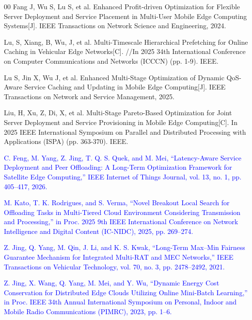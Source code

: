 \documentclass[10pt, conference, letterpaper]{IEEEtran}
\newcommand{\rev}[1]{\textcolor{blue}{#1}}
\newcommand{\rev}[1]{#1}
\begin{document}
\begin{thebibliography}{00}
 Fang J, Wu S, Lu S, et al. Enhanced Profit-driven Optimization for Flexible Server Deployment and Service Placement in Multi-User Mobile Edge Computing Systems[J]. IEEE Transactions on Network Science and Engineering, 2024.

 Lu, S, Xiang, B, Wu, J, et al. Multi-Timescale Hierarchical Prefetching for Online Caching in Vehicular Edge Networks[C]. //In 2025 34th International Conference on Computer Communications and Networks (ICCCN) (pp. 1-9). IEEE.

 Lu S, Jin X, Wu J, et al. Enhanced Multi-Stage Optimization of Dynamic QoS-Aware Service Caching and Updating in Mobile Edge Computing[J]. IEEE Transactions on Network and Service Management, 2025.

 Liu, H, Xu, Z, Di, X, et al. Multi-Stage Pareto-Based Optimization for Joint Server Deployment and Service Provisioning in Mobile Edge Computing[C]. In 2025 IEEE International Symposium on Parallel and Distributed Processing with Applications (ISPA) (pp. 363-370). IEEE.

 \rev{C. Feng, M. Yang, Z. Jing, T. Q. S. Quek, and M. Mei, ``Latency-Aware Service Deployment and Peer Offloading: A Long-Term Optimization Framework for Satellite Edge Computing,'' IEEE Internet of Things Journal, vol. 13, no. 1, pp. 405--417, 2026.}

 \rev{M. Kato, T. K. Rodrigues, and S. Verma, ``Novel Breakout Local Search for Offloading Tasks in Multi-Tiered Cloud Environment Considering Transmission and Processing,'' in Proc. 2025 9th IEEE International Conference on Network Intelligence and Digital Content (IC-NIDC), 2025, pp. 269--274.}

 \rev{Z. Jing, Q. Yang, M. Qin, J. Li, and K. S. Kwak, ``Long-Term Max--Min Fairness Guarantee Mechanism for Integrated Multi-RAT and MEC Networks,'' IEEE Transactions on Vehicular Technology, vol. 70, no. 3, pp. 2478--2492, 2021.}

 \rev{Z. Jing, X. Wang, Q. Yang, M. Mei, and Y. Wu, ``Dynamic Energy Cost Conservation for Distributed Edge Clouds Utilizing Online Mini-Batch Learning,'' in Proc. IEEE 34th Annual International Symposium on Personal, Indoor and Mobile Radio Communications (PIMRC), 2023, pp. 1--6.}


\end{thebibliography}
\end{document}
